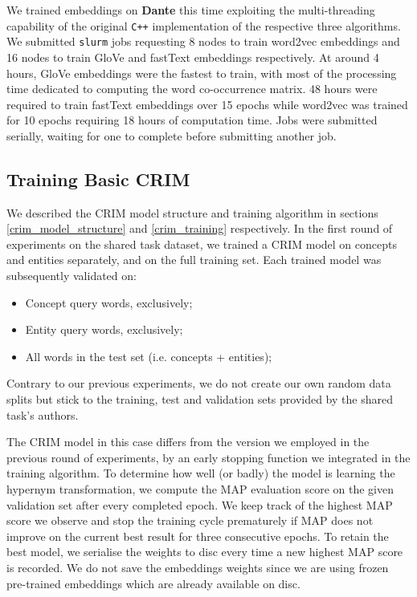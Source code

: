 We trained embeddings on \textbf{Dante} this time exploiting the multi-threading capability of the original \texttt{C++} implementation of the respective three algorithms.  We submitted \texttt{slurm} jobs requesting 8 nodes to train word2vec embeddings and 16 nodes to train GloVe and fastText embeddings respectively.  At around 4 hours, GloVe embeddings were the fastest to train, with most of the processing time dedicated to computing the word co-occurrence matrix.  48 hours were required to train fastText embeddings over 15 epochs while word2vec was trained for 10 epochs requiring 18 hours of computation time.  Jobs were submitted serially, waiting for one to complete before submitting another job.  

\subsection{Training Basic CRIM}
We described the CRIM model structure and training algorithm in sections \ref{crim_model_structure} and \ref{crim_training} respectively.  In the first round of experiments on the shared task dataset, we trained a CRIM model on concepts and entities separately, and on the full training set.  Each trained model was subsequently validated on:
\begin{itemize}
    \item Concept query words, exclusively;
    \item Entity query words, exclusively;
    \item All words in the test set (i.e. concepts + entities);
\end{itemize}
Contrary to our previous experiments, we do not create our own random data splits but stick to the training, test and validation sets provided by the shared task's authors.

The CRIM model in this case differs from the version we employed in the previous round of experiments, by an early stopping function we integrated in the training algorithm.  To determine how well (or badly) the model is learning the hypernym transformation, we compute the \ac{MAP} evaluation score on the given validation set after every completed epoch.  We keep track of the highest \ac{MAP} score we observe and stop the training cycle prematurely if \ac{MAP} does not improve on the current best result for three consecutive epochs.  To retain the best model, we serialise the weights to disc every time a new highest \ac{MAP} score is recorded.  We do not save the embeddings weights since we are using frozen pre-trained embeddings which are already available on disc.  

